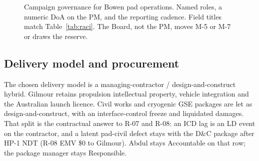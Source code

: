 \begin{figure}[H]
{%
}
\caption[Campaign governance structure]{Campaign governance for Bowen pad operations. Named roles, a numeric DoA on the PM, and the reporting cadence. Field titles match Table~\ref{tab:raci}. The Board, not the PM, moves M-5 or M-7 or draws the \PEPcontingency reserve.}
\label{fig:governance}
\end{figure}

\subsection{Delivery model and procurement}
\label{sec:delivery-model}

The chosen delivery model is a managing-contractor / design-and-construct hybrid. Gilmour retains propulsion intellectual property, vehicle integration and the Australian launch licence. Civil works and cryogenic GSE packages are let as design-and-construct, with an interface-control freeze and liquidated damages. That split is the contractual answer to R-07 and R-08: an ICD lag is an LD event on the contractor, and a latent pad-civil defect stays with the D\&C package after HP-1 NDT (R-08 EMV \$0 to Gilmour). Abdul stays Accountable on that row; the package manager stays Responsible.

